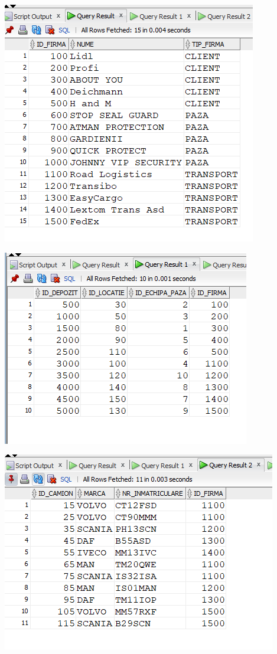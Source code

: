 \documentclass[12pt, a4paper]{article}
\begin{document}
\includegraphics[width=\textwidth]{10_2.png}

\includegraphics[width=\textwidth]{10_3.png}

\includegraphics[width=\textwidth]{10_4.png}
\end{document}
